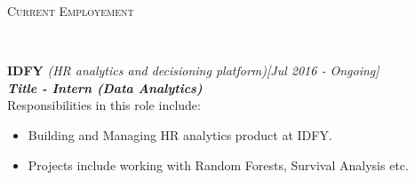 \documentclass[a4paper,10pt]{article}
\newenvironment{changemargin}[2]{%
	\begin{list}{}{%
			\setlength{\topsep}{0pt}%
			\setlength{\leftmargin}{#1}%
			\setlength{\rightmargin}{#2}%
			\setlength{\listparindent}{\parindent}%
			\setlength{\parsep}{\parskip}%
		}%
		\item[]}{\end{list}
}
\newcommand{\lineover}{
	\begin{changemargin}{-0.0in}{-0.0in}
		\vspace*{-8pt}
		\hrulefill \\
		\vspace*{-2pt}
	\end{changemargin}
}
\newcommand{\header}[1]{
	\begin{changemargin}{-0.0in}{-0.0in}
		\large	\scshape {#1}\\	
		\lineover
	\end{changemargin}
}
\newenvironment{body} {
	\vspace*{-16pt}
	\begin{changemargin}{-0.0in}{-0.in}
	}	
	{\end{changemargin}
}
\begin{document}
\vspace{1ex}
	\header{Current Employement}
	\vspace{-0.5ex}
	\begin{body}
		\vspace{14pt}
		
		\setlength{\itemindent}{0em}
		
		
		\textbf{IDFY} \emph{(HR analytics and decisioning platform)}\hfill \emph{[Jul 2016 - Ongoing]} \\
		\emph{\textbf{Title - Intern (Data Analytics)}}\\
		\vspace{-0.5ex}
		Responsibilities in this role include:
		\vspace{-1ex}
		\begin{itemize}
			\setlength{\itemindent}{0em}
			\item Building and Managing HR analytics product at IDFY.
			\vspace{-1ex}
			\item Projects include working with  Random Forests, Survival Analysis etc.
		\end{itemize}
		
	\end{body}
	
\end{document}
